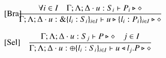 \begin{figure}[t]
\[\begin{array}{lc}

		\trule{Bra}& \hspace{-0.5cm}\tree{
			 \forall i \in I \quad \Gamma; \Lambda; \Delta \cat u:S_i \proves P_i \hastype \Proc
		}{
			\Gamma; \Lambda; \Delta \cat u: \btbra{l_i:S_i}_{i \in I} \proves \bbra{u}{l_i:P_i}_{i \in I}\hastype \Proc
		}
\\[6mm]
	 	\trule{Sel}& \hspace{-0.5cm}\tree{
			\Gamma; \Lambda; \Delta \cat u: S_j  \proves P \hastype \Proc \quad j \in I

		}{
			\Gamma; \Lambda; \Delta \cat u:\btsel{l_i:S_i}_{i \in I} \proves \bsel{u}{l_j} P \hastype \Proc
		}
		\\[6mm]

%


\end{array}\]
\end{figure}
